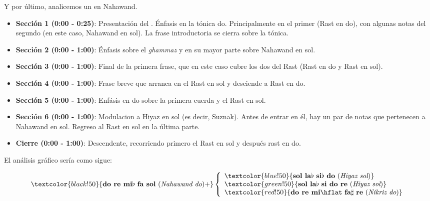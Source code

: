 \vspace*{.5cm}



Y por último, analicemos un \taqsim en \maqam Nahawand.



\begin{itemize}
\item \textbf{Sección 1 (0:00 - 0:25)}: Presentación del \maqam. Énfasis en la tónica do. Principalmente en el primer \yins (Rast en do), con algunas notas del segundo (en este caso, Nahawand en sol). La frase introductoria se cierra sobre la tónica.
\item \textbf{Sección 2 (0:00 - 1:00)}: Énfasis sobre el \emph{ghammaz} y en su mayor parte sobre Nahawand en sol.
\item \textbf{Sección 3 (0:00 - 1:00)}: Final de la primera frase, que en este caso cubre los dos \ashnas del \maqam Rast (Rast en do y Rast en sol).
\item \textbf{Sección 4 (0:00 - 1:00)}: Frase breve que arranca en el \yins Rast en sol y desciende a Rast en do.
\item \textbf{Sección 5 (0:00 - 1:00)}: Enfásis en do sobre la primera cuerda y el \yins Rast en sol.
\item \textbf{Sección 6 (0:00 - 1:00)}: Modulacion a \yins Hiyaz en sol (es decir, \maqam Suznak). Antes de entrar en él, hay un par de notas que pertenecen a Nahawand en sol. Regreso al \yins Rast en sol en la última parte.
\item \textbf{Cierre (0:00 - 1:00)}: Descendente, recorriendo primero el \yins Rast en sol y después rast en do.
\end{itemize}

El análisis gráfico sería como sigue:

\[
    \textcolor{black!50}{\text{\textbf{do re mi}}\flat\ \text{\textbf{fa sol} ({\it Nahawand do})}+} \left\{\begin{array}{lr}
        \textcolor{blue!50}{\text{\textbf{sol la}}\flat\ \text{\textbf{si}}\flat\ \text{\textbf{do} ({\it Hiyaz sol})}}\\
        \textcolor{green!50}{\text{\textbf{sol la}}\flat\ \text{\textbf{si do re} ({\it Hiyaz sol})}}\\
        \textcolor{red!50}{\text{\textbf{do re mi}}\hflat\ \text{\textbf{fa}}\sharp\ \text{\textbf{re} ({\it Nikriz do})}}\\
        \end{array}\right.
  \]


